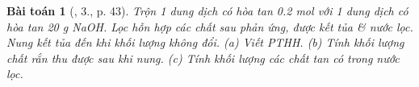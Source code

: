 \documentclass{article}
\newtheorem{baitoan}{Bài toán}
\begin{document}
\begin{baitoan}[\cite{SGK_Hoa_Hoc_9}, 3., p. 43]
	Trộn 1 dung dịch có hòa tan {\rm0.2 mol } với 1 dung dịch có hòa tan {\rm20 g NaOH}. Lọc hỗn hợp các chất sau phản ứng, được kết tủa \& nước lọc. Nung kết tủa đến khi khối lượng không đổi. (a) Viết {\rm PTHH}. (b) Tính khối lượng chất rắn thu được sau khi nung. (c) Tính khối lượng các chất tan có trong nước lọc.
\end{baitoan}


\printbibliography[heading=bibintoc]
\end{document}
